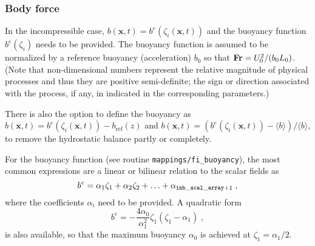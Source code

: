 \subsubsection{Body force}

In the incompressible case, $b(\mathbf{x},t)=b^e(\zeta_i(\mathbf{x},t))$ and the buoyancy function $b^e(\zeta_i)$ needs to be provided. The buoyancy function is assumed to be normalized by a reference buoyancy (acceleration) $b_0$ so that $\mathrm{\bf Fr}=U_0^2/(b_0L_0)$. (Note that non-dimensional numbers represent the relative magnitude of physical processes and thus they are positive semi-definite; the sign or direction associated with the process, if any, in indicated in the corresponding parameters.)

There is also the option to define the buoyancy as $b(\mathbf{x},t)=b^e(\zeta_i(\mathbf{x},t))-b_\mathrm{ref}(z)$ and $b(\mathbf{x},t)=(b^e(\zeta_i(\mathbf{x},t))-\langle b\rangle)/\langle b\rangle$, to remove the hydrostatic balance partly or completely.

For the buoyancy function (see routine {\tt mappings/fi\_buoyancy}), the most common expressions are a linear or bilinear relation to the scalar fields as
\begin{equation}
    b^e=\alpha_1\zeta_1+\alpha_2\zeta_2+\ldots+\alpha_\mathrm{\tt inb\_scal\_array+1}\;,
\end{equation}
where the coefficients $\alpha_i$ need to be provided. A quadratic form
\begin{equation}
    b^e=-\frac{4\alpha_0}{\alpha_1^2}\zeta_1(\zeta_1-\alpha_1) \;,
\end{equation}
is also available, so that the maximum buoyancy $\alpha_0$ is achieved at
$\zeta_1=\alpha_1/2$.

